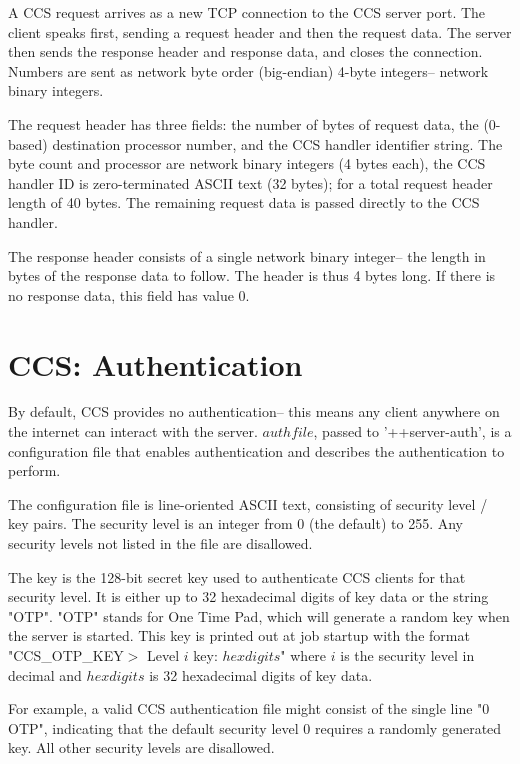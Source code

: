 A CCS request arrives as a new TCP connection to the CCS server port.
The client speaks first, sending a request header and then the request
data.  The server then sends the response header and response data,
and closes the connection.  Numbers are sent as network byte order
(big-endian) 4-byte integers-- network binary integers.

The request header has three fields: the number of bytes of request data,
the (0-based) destination processor number, and the CCS handler identifier
string.  The byte count and processor are network binary integers (4 bytes
each), the CCS handler ID is zero-terminated ASCII text (32 bytes); for
a total request header length of 40 bytes.  The remaining request data
is passed directly to the CCS handler.

The response header consists of a single network binary integer-- the 
length in bytes of the response data to follow.  The header is thus 4 
bytes long.  If there is no response data, this field has value 0.


\section{CCS: Authentication}
By default, CCS provides no authentication-- this means any
client anywhere on the internet can interact with the server.
$authfile$, passed to '++server-auth', is a configuration file
that enables authentication and describes the authentication to 
perform.

The configuration file is line-oriented ASCII text,
consisting of security level / key pairs.  The security
level is an integer from 0 (the default) to 255.
Any security levels not listed in the file are disallowed.

The key is the 128-bit secret key used to authenticate CCS
clients for that security level.  It is either up 
to 32 hexadecimal digits of key data or the string "OTP".
"OTP" stands for One Time Pad, which will generate a random
key when the server is started.  This key is printed out
at job startup with the format "CCS\_OTP\_KEY$>$ Level $i$ key: $hexdigits$"
where $i$ is the security level in decimal and $hexdigits$ is
32 hexadecimal digits of key data.

For example, a valid CCS authentication file might consist of
the single line "0 OTP", indicating that the default security
level 0 requires a randomly generated key.  All other security
levels are disallowed.


